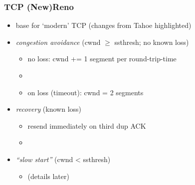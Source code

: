 \begin{frame}
\frametitle{TCP (New)Reno}
\begin{itemize}
    \item base for `modern' TCP (changes from Tahoe highlighted)
    \item \textit{congestion avoidance} (cwnd $\ge$ ssthresh; no known loss)
        \begin{itemize}
        \item no loss: cwnd += 1 segment per round-trip-time
        \item {}
        \item on loss (timeout): cwnd = 2 segments
        \end{itemize}
    \item \textit{recovery} (known loss)
        \begin{itemize}
        \item resend immediately on third dup ACK
        \item {}
        \end{itemize}
    \item \textit{``slow start''} (cwnd < ssthresh)
        \begin{itemize}
        \item (details later)
        \end{itemize}
    \end{itemize}
\end{frame}
